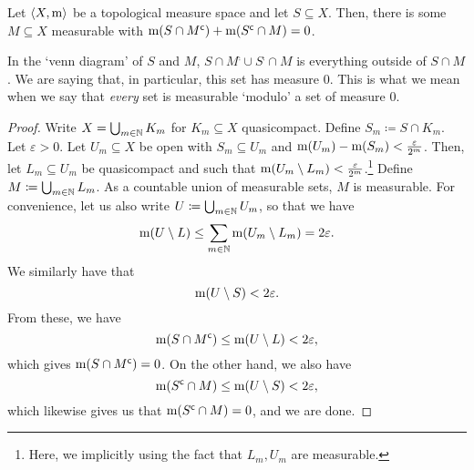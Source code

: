 \begin{prp}\label{ModuloZero}
Let $\langle X,\mathrm{m}\rangle$ be a topological measure space and let $S\subseteq X$.  Then, there is some $M\subseteq X$ measurable with $\mathrm{m} (S\cap M^{\mathsf{c}})+\mathrm{m} (S^{\mathsf{c}}\cap M)=0$.
\begin{rmk}
In the `venn diagram' of $S$ and $M$, $S\cap M^{\comp}\cup S^{\comp}\cap M$ is everything outside of $S\cap M$.  We are saying that, in particular, this set has measure $0$.  This is what we mean when we say that \emph{every} set is measurable `modulo' a set of measure $0$.
\end{rmk}
\begin{proof}
Write $X=\bigcup _{m\in \mathbb{N}}K_m$ for $K_m\subseteq X$ quasicompact.  Define $S_m\coloneqq S\cap K_m$.  Let $\varepsilon >0$.  Let $U_m\subseteq X$ be open with $S_m\subseteq U_m$ and $\mathrm{m} (U_m)-\mathrm{m} (S_m)<\frac{\varepsilon}{2^m}$.  Then, let $L_m\subseteq U_m$ be quasicompact and such that $\mathrm{m} (U_m\setminus L_m)<\frac{\varepsilon}{2^m}$.\footnote{Here, we implicitly using the fact that $L_m,U_m$ are measurable.}  Define $M\coloneqq \bigcup _{m\in \mathbb{N}}L_m$.  As a countable union of measurable sets, $M$ is measurable.  For convenience, let us also write $U\coloneqq \bigcup _{m\in \mathbb{N}}U_m$, so that we have
\begin{equation}
\mathrm{m} (U\setminus L)\leq \sum _{m\in \mathbb{N}}\mathrm{m} (U_m\setminus L_m)=2\varepsilon .
\end{equation}
We similarly have that
\begin{equation}
\mathrm{m} (U\setminus S)<2\varepsilon .
\end{equation}
From these, we have
\begin{equation}
\mathrm{m} (S\cap M^{\mathsf{c}})\leq \mathrm{m} (U\setminus L)<2\varepsilon ,
\end{equation}
which gives $\mathrm{m} (S\cap M^{\mathsf{c}})=0$.  On the other hand, we also have
\begin{equation}
\mathrm{m} (S^{\mathsf{c}}\cap M)\leq \mathrm{m} (U\setminus S)<2\varepsilon ,
\end{equation}
which likewise gives us that $\mathrm{m} (S^{\mathsf{c}}\cap M)=0$, and we are done.
\end{proof}
\end{prp}

